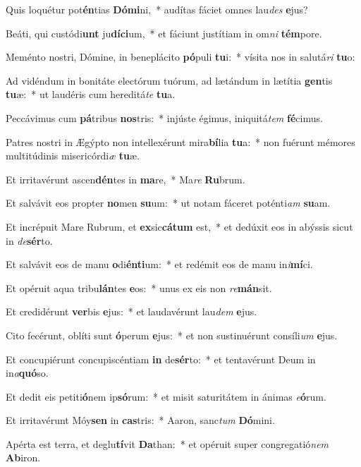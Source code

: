 \item Quis loquétur pot\textbf{én}tias \textbf{Dó}\textbf{mi}ni,~* audítas fáciet omnes lau\textit{des} \textbf{e}jus?
\item Beáti, qui custódi\textbf{unt} ju\textbf{dí}\textbf{ci}um,~* et fáciunt justítiam in om\textit{ni} \textbf{tém}pore.
\item Meménto nostri, Dómine, in beneplácito \textbf{pó}puli \textbf{tu}i:~* vísita nos in salutá\textit{ri} \textbf{tu}o:
\item Ad vidéndum in bonitáte electórum tuórum, ad lætándum in lætítia \textbf{gen}tis \textbf{tu}æ:~* ut laudéris cum hereditá\textit{te} \textbf{tu}a.
\item Peccávimus cum \textbf{pá}tribus \textbf{nos}tris:~* injúste égimus, iniquitá\textit{tem} \textbf{fé}cimus.
\item Patres nostri in Ægýpto non intellexérunt mira\textbf{bí}lia \textbf{tu}a:~* non fuérunt mémores multitúdinis misericórdi\textit{æ} \textbf{tu}æ.
\item Et irritavérunt ascen\textbf{dén}tes in \textbf{ma}re,~* Ma\textit{re} \textbf{Ru}brum.
\item Et salvávit eos propter \textbf{no}men \textbf{su}um:~* ut notam fáceret poténti\textit{am} \textbf{su}am.
\item Et incrépuit Mare Rubrum, et \textbf{ex}sic\textbf{cá}\textbf{tum} est,~* et dedúxit eos in abýssis sicut in \textit{de}\textbf{sér}to.
\item Et salvávit eos de manu \textbf{o}di\textbf{én}\textbf{ti}um:~* et redémit eos de manu in\textit{i}\textbf{mí}ci.
\item Et opéruit aqua tribu\textbf{lán}tes \textbf{e}os:~* unus ex eis non \textit{re}\textbf{mán}sit.
\item Et credidérunt \textbf{ver}bis \textbf{e}jus:~* et laudavérunt lau\textit{dem} \textbf{e}jus.
\item Cito fecérunt, oblíti sunt \textbf{ó}perum \textbf{e}jus:~* et non sustinuérunt consíli\textit{um} \textbf{e}jus.
\item Et concupiérunt concupiscéntiam \textbf{in} de\textbf{sér}to:~* et tentavérunt Deum in in\textit{a}\textbf{quó}so.
\item Et dedit eis petiti\textbf{ó}nem ip\textbf{só}rum:~* et misit saturitátem in ánimas \textit{e}\textbf{ó}rum.
\item Et irritavérunt Móy\textbf{sen} in \textbf{cas}tris:~* Aaron, sanc\textit{tum} \textbf{Dó}mini.
\item Apérta est terra, et deglu\textbf{tí}vit \textbf{Da}than:~* et opéruit super congregatió\textit{nem} \textbf{Ab}iron.
